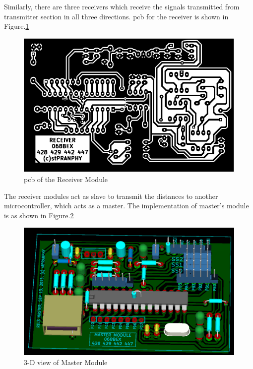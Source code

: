 Similarly, there are three receivers which receive the signals transmitted from transmitter section in all three directions. \gls{pcb} for the receiver is shown in Figure.\ref{fig:ReceiverPCB}
\begin{figure}[htpb]
	\centering
	\includegraphics[scale=1]{Images/ReceiverModulePCB.pdf}
	\caption{\gls{pcb} of the Receiver Module}
	\label{fig:ReceiverPCB}
\end{figure}

The receiver modules act as slave to transmit the distances to another microcontroller, which acts as a master. The implementation of master's module is as shown in Figure.\ref{fig:MasterModule}
\begin{figure}[htpb]
	\centering
	\includegraphics[scale=0.25]{Images/MasterModule.png}
	\caption{3-D view of Master Module}
	\label{fig:MasterModule}
\end{figure}
